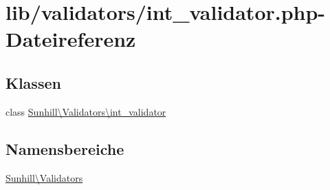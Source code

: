 \hypertarget{int__validator_8php}{}\section{lib/validators/int\+\_\+validator.php-\/\+Dateireferenz}
\label{int__validator_8php}
\subsection*{Klassen}
\begin{DoxyCompactItemize}
\item 
class \hyperlink{classSunhill_1_1Validators_1_1int__validator}{Sunhill\textbackslash{}\+Validators\textbackslash{}int\+\_\+validator}
\end{DoxyCompactItemize}
\subsection*{Namensbereiche}
\begin{DoxyCompactItemize}
\item 
 \hyperlink{namespaceSunhill_1_1Validators}{Sunhill\textbackslash{}\+Validators}
\end{DoxyCompactItemize}
